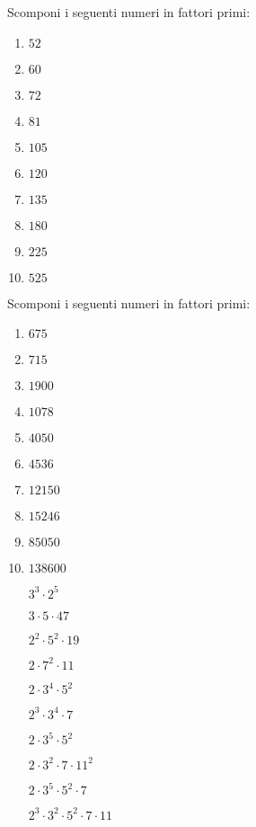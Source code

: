 \begin{esercizio}[*]
Scomponi i seguenti numeri in fattori primi:
 \begin{multicols}{5}
 \begin{enumerate}[noitemsep, label=(\alph*)]
 \item \(52\)
 \item \(60\)
 \item \(72\)
 \item \(81\)
 \item \(105\)
 \item \(120\)
 \item \(135\)
 \item \(180\)
 \item \(225\)
 \item \(525\)
 \end{enumerate}
 \end{multicols}
\end{esercizio}

\begin{esercizio}[*]
Scomponi i seguenti numeri in fattori primi:
 \begin{multicols}{5}
 \begin{enumerate}[noitemsep, label=(\alph*)]
 \item \(675\)
 \item \(715\)
 \item \(1900\) 
 \item \(1078\) 
 \item \(4050\) 
 \item \(4536\) 
 \item \(12150\) 
 \item \(15246\)
 \item \(85050\) 
 \item \(138600\)
 \end{enumerate}
 \end{multicols}
 \begin{multicols}{5}
 \begin{enumerate}[noitemsep, label=(\alph*)]
 \item [\(3^3 \cdot 2^5\)] 
 \item [\(3 \cdot 5 \cdot 47\)] 
 \item [\(2^2\cdot 5^2\cdot 19\)] 
 \item [\(2\cdot7^2\cdot11\)] 
 \item [\(2\cdot3^4\cdot5^2\)] 
 \item [\(2^3\cdot3^4\cdot7\)]
 \item [\(2\cdot3^5\cdot5^2\)]
 \item [\(2\cdot3^2\cdot7\cdot11^2\)]
 \item [\(2\cdot3^5\cdot5^2\cdot7\)]
 \item [\(2^3\cdot3^2\cdot5^2\cdot7\cdot11\)]
 \end{enumerate}
 \end{multicols}
\end{esercizio}

